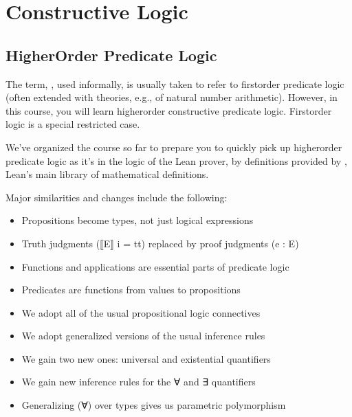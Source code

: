 \documentclass[letterpaper,10pt,english]{sphinxmanual}
\begin{document}
\chapter{Constructive Logic}
\label{\detokenize{A_02_Constructive_Logic:constructive-logic}}\label{\detokenize{A_02_Constructive_Logic:introduction}}\label{\detokenize{A_02_Constructive_Logic::doc}}

\section{Higher\sphinxhyphen{}Order Predicate Logic}
\label{\detokenize{A_02_Constructive_Logic:higher-order-predicate-logic}}
\sphinxAtStartPar
The term, , used informally, is usually taken to
refer to first\sphinxhyphen{}order predicate logic (often extended with theories,
e.g., of natural number arithmetic). However, in this course, you
will learn higher\sphinxhyphen{}order constructive predicate logic. First\sphinxhyphen{}order
logic is a special restricted case.

\sphinxAtStartPar
We’ve organized the course so far to prepare you to quickly pick
up higher\sphinxhyphen{}order predicate logic as it’s  in the logic of
the Lean prover, by definitions provided by , Lean’s main
library of mathematical definitions.

\sphinxAtStartPar
Major similarities and changes include the following:
\begin{itemize}
\item {} 
\sphinxAtStartPar
Propositions become types, not just logical expressions

\item {} 
\sphinxAtStartPar
Truth judgments (⟦E⟧ i = tt) replaced by proof judgments (e : E)

\item {} 
\sphinxAtStartPar
Functions and applications are essential parts of predicate logic

\item {} 
\sphinxAtStartPar
Predicates are functions from values to propositions 

\item {} 
\sphinxAtStartPar
We adopt all of the usual propositional logic connectives

\item {} 
\sphinxAtStartPar
We adopt generalized versions of the usual inference rules

\item {} 
\sphinxAtStartPar
We gain two new ones: universal and existential quantifiers

\item {} 
\sphinxAtStartPar
We gain new inference rules for the ∀ and ∃ quantifiers

\item {} 
\sphinxAtStartPar
Generalizing (∀) over types gives us parametric polymorphism

\end{itemize}
\end{document}
